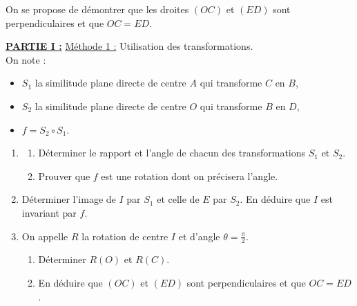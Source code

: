 \begin{figure}[h!]
      \end{figure}
      On se propose de d\'emontrer que les droites $(OC)$ et $(ED)$ sont perpendiculaires et que $OC = ED$.
      
      \noindent \underline{\textbf{PARTIE I :}} \underline{M\'ethode 1 :} Utilisation des transformations.      \\
            On note :
                  \begin{itemize}
                        \item $S_1$ la similitude plane directe de centre $A$ qui transforme $C$ en $B$,
                        \item $S_2$ la similitude plane directe de centre $O$ qui transforme $B$ en $D$,
                        \item $f = S_2 \circ S_1$.
                  \end{itemize}
            \begin{enumerate}
                  \item \begin{enumerate}
                              \item D\'eterminer le rapport et l'angle de chacun des transformations $S_1$ et $S_2$.
                              \item Prouver que $f$ est une rotation dont on pr\'ecisera l'angle.
                        \end{enumerate}
                  \item D\'eterminer l'image de $I$ par $S_1$ et celle de $E$ par $S_2$.
                        En d\'eduire que $I$ est invariant par $f$.
                  \item On appelle $R$ la rotation de centre $I$ et d'angle $\theta = \frac{\pi}{2}$.
                        \begin{enumerate}
                              \item D\'eterminer $R(O)$ et $R(C)$.
                              \item En d\'eduire que $(OC)$ et $(ED)$ sont perpendiculaires et que $OC = ED$.
                        \end{enumerate}
            \end{enumerate}
      
